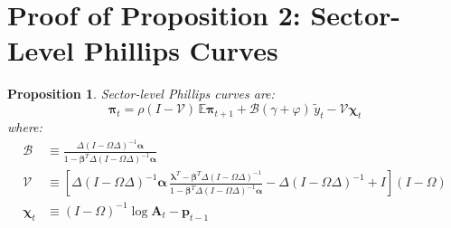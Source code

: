 \documentclass[12pt]{article}
\newtheorem{proposition}{Proposition}
\begin{document}
\section{Proof of Proposition 2: Sector-Level Phillips Curves}

\begin{proposition}
Sector-level Phillips curves are:
\begin{equation}
    \bm{\pi}_t = \rho(I-\mathcal{V})\,\mathbb{E}\bm{\pi}_{t+1} + \mathcal{B}(\gamma+\varphi)\,\tilde{y}_t - \mathcal{V}\bm{\chi}_t
    \label{eq:prop2}
\end{equation}
where:
\begin{align}
    \mathcal{B} &\equiv \frac{\Delta(I-\Omega\Delta)^{-1}\bm{\alpha}}{1 - \bm{\beta}^T\Delta(I-\Omega\Delta)^{-1}\bm{\alpha}} \label{eq:B_def}\\[6pt]
    \mathcal{V} &\equiv \left[\Delta(I-\Omega\Delta)^{-1}\bm{\alpha}\,\frac{\bm{\lambda}^T - \bm{\beta}^T\Delta(I-\Omega\Delta)^{-1}}{1 - \bm{\beta}^T\Delta(I-\Omega\Delta)^{-1}\bm{\alpha}} - \Delta(I-\Omega\Delta)^{-1} + I\right](I-\Omega) \label{eq:V_def}\\[6pt]
    \bm{\chi}_t &\equiv (I-\Omega)^{-1}\log\mathbf{A}_t - \bm{p}_{t-1}
\end{align}
\end{proposition}
\end{document}
